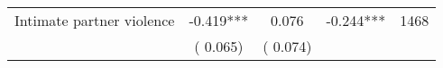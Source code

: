 \begin{tabular}{l*{4}{c}}
 Intimate partner violence &             -0.419*** &         0.076 &          -0.244*** & 1468                       \\  
                 &        (       0.065)                   &        (       0.074)                        &                                                             &                                                      \\      

\hline \end{tabular}                                                                                                              
